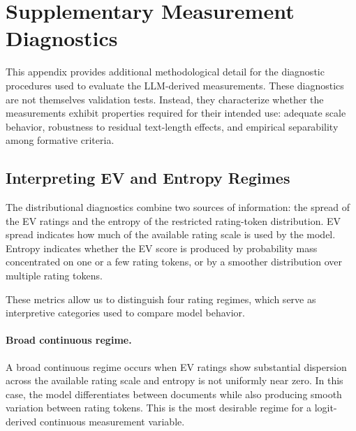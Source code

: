 \section{Supplementary Measurement Diagnostics}
\label{app:measurement_diagnostics}

This appendix provides additional methodological detail for the diagnostic procedures used to evaluate the LLM-derived measurements. These diagnostics are not themselves validation tests. Instead, they characterize whether the measurements exhibit properties required for their intended use: adequate scale behavior, robustness to residual text-length effects, and empirical separability among formative criteria.




\subsection{Interpreting EV and Entropy Regimes}
\label{app:rating_regimes}

The distributional diagnostics combine two sources of information: the spread of the EV ratings and the entropy of the restricted rating-token distribution. EV spread indicates how much of the available rating scale is used by the model. Entropy indicates whether the EV score is produced by probability mass concentrated on one or a few rating tokens, or by a smoother distribution over multiple rating tokens.

These metrics allow us to distinguish four rating regimes, which serve as interpretive categories used to compare model behavior.

\paragraph{Broad continuous regime.}
A broad continuous regime occurs when EV ratings show substantial dispersion across the available rating scale and entropy is not uniformly near zero. In this case, the model differentiates between documents while also producing smooth variation between rating tokens. This is the most desirable regime for a logit-derived continuous measurement variable.

